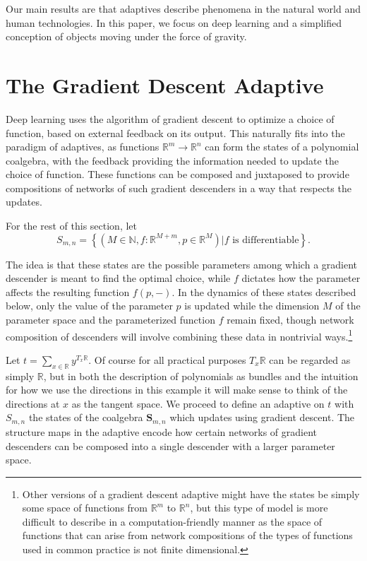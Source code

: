 \documentclass[11pt, one side, article]{memoir}
\theoremstyle{definition}
\theoremstyle{plain}
\newenvironment{definition}
  {\pushQED{\qed}\renewcommand{\qedsymbol}{$\lozenge$}\definitionx}
  {\popQED\enddefinitionx}
\newcommand{\Cat}[1]{\mathbf{#1}}%
\newcommand{\nn}{\mathbb{N}}
\newcommand{\rr}{\mathbb{R}}
\newcommand{\0}{\textsf{0}}
\newcommand{\1}{\tn{\textsf{1}}}
\renewcommand{\S}{{\Cat{S}}}
\begin{document}
Our main results are that adaptives describe phenomena in the natural world and human technologies. In this paper, we focus on deep learning and a simplified conception of objects moving under the force of gravity.


\section{The Gradient Descent Adaptive}

Deep learning uses the algorithm of gradient descent to optimize a choice of function, based on external feedback on its output. This naturally fits into the paradigm of adaptives, as functions $\rr^m \to \rr^n$ can form the states of a polynomial coalgebra, with the feedback providing the information needed to update the choice of function. These functions can be composed and juxtaposed to provide compositions of networks of such gradient descenders in a way that respects the updates.

\begin{definition}
For the rest of this section, let 
\[S_{m,n} = \left\{(M \in \nn, f : \rr^{M+m}, p \in \rr^M) | f \textrm{ is differentiable}\right\}.
\]
\end{definition}

The idea is that these states are the possible parameters among which a gradient descender is meant to find the optimal choice, while $f$ dictates how the parameter affects the resulting function $f(p,-)$. In the dynamics of these states described below, only the value of the parameter $p$ is updated while the dimension $M$ of the parameter space and the parameterized function $f$ remain fixed, though network composition of descenders will involve combining these data in nontrivial ways.\footnote{Other versions of a gradient descent adaptive might have the states be simply some space of functions from $\rr^m$ to $\rr^n$, but this type of model is more difficult to describe in a computation-friendly manner as the space of functions that can arise from network compositions of the types of functions used in common practice is not finite dimensional.}%


Let $t = \sum_{x \in \rr} y^{T_x \rr}$.  Of course for all practical purposes $T_x \rr$ can be regarded as simply $\rr$, but in both the description of polynomials as bundles and the intuition for how we use the directions in this example it will make sense to think of the directions at $x$ as the tangent space. We proceed to define an adaptive on $t$ with $S_{m,n}$ the states of the coalgebra $\S_{m,n}$ which updates using gradient descent. The structure maps in the adaptive encode how certain networks of gradient descenders can be composed into a single descender with a larger parameter space.
\end{document}
